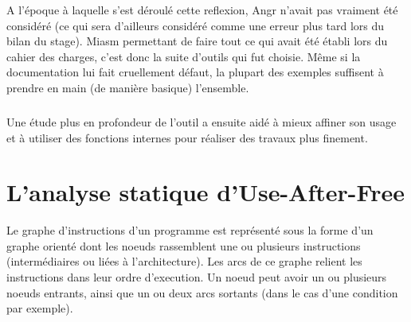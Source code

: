 A l'époque à laquelle s'est déroulé cette reflexion, Angr n'avait pas vraiment été
considéré (ce qui sera d'ailleurs considéré comme une erreur plus tard lors du bilan du stage).
Miasm permettant de faire tout ce qui avait été établi lors du cahier des charges, c'est donc la suite d'outils qui fut choisie.
Même si la documentation lui fait cruellement défaut, la plupart des exemples suffisent à prendre en main (de manière basique) l'ensemble.
\subparagraph{}
Une étude plus en profondeur de l'outil a ensuite aidé à mieux affiner son usage et à utiliser des fonctions internes pour réaliser des travaux
plus finement.

\section{L'analyse statique d'Use-After-Free}
Le graphe d'instructions d'un programme est représenté sous la forme d'un graphe orienté dont les noeuds rassemblent une ou plusieurs
instructions (intermédiaires ou liées à l'architecture). Les arcs de ce graphe relient les instructions dans leur ordre d'execution.
Un noeud peut avoir un ou plusieurs noeuds entrants, ainsi que un ou deux arcs sortants (dans le cas d'une condition par exemple).
